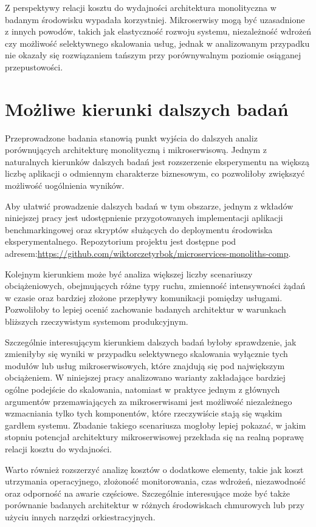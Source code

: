 Z perspektywy relacji kosztu do wydajności architektura monolityczna w badanym środowisku wypadała korzystniej. Mikroserwisy mogą być uzasadnione z innych powodów, takich jak elastyczność rozwoju systemu, niezależność wdrożeń czy możliwość selektywnego skalowania usług, jednak w analizowanym przypadku nie okazały się rozwiązaniem tańszym przy porównywalnym poziomie osiąganej przepustowości.

\section{Możliwe kierunki dalszych badań}

Przeprowadzone badania stanowią punkt wyjścia do dalszych analiz porównujących architekturę monolityczną i mikroserwisową. Jednym z naturalnych kierunków dalszych badań jest rozszerzenie eksperymentu na większą liczbę aplikacji o odmiennym charakterze biznesowym, co pozwoliłoby zwiększyć możliwość uogólnienia wyników.

Aby ułatwić prowadzenie dalszych badań w tym obszarze, jednym z wkładów niniejszej pracy jest udostępnienie przygotowanych implementacji aplikacji benchmarkingowej oraz skryptów służących do deploymentu środowiska eksperymentalnego. Repozytorium projektu jest dostępne pod adresem:\url{https://github.com/wiktorczetyrbok/microservices-monoliths-comp}.

Kolejnym kierunkiem może być analiza większej liczby scenariuszy obciążeniowych, obejmujących różne typy ruchu, zmienność intensywności żądań w czasie oraz bardziej złożone przepływy komunikacji pomiędzy usługami. Pozwoliłoby to lepiej ocenić zachowanie badanych architektur w warunkach bliższych rzeczywistym systemom produkcyjnym.

Szczególnie interesującym kierunkiem dalszych badań byłoby sprawdzenie, jak zmieniłyby się wyniki w przypadku selektywnego skalowania wyłącznie tych modułów lub usług mikroserwisowych, które znajdują się pod największym obciążeniem. W niniejszej pracy analizowano warianty zakładające bardziej ogólne podejście do skalowania, natomiast w praktyce jednym z głównych argumentów przemawiających za mikroserwisami jest możliwość niezależnego wzmacniania tylko tych komponentów, które rzeczywiście stają się wąskim gardłem systemu. Zbadanie takiego scenariusza mogłoby lepiej pokazać, w jakim stopniu potencjał architektury mikroserwisowej przekłada się na realną poprawę relacji kosztu do wydajności.

Warto również rozszerzyć analizę kosztów o dodatkowe elementy, takie jak koszt utrzymania operacyjnego, złożoność monitorowania, czas wdrożeń, niezawodność oraz odporność na awarie częściowe. Szczególnie interesujące może być także porównanie badanych architektur w różnych środowiskach chmurowych lub przy użyciu innych narzędzi orkiestracyjnych.

